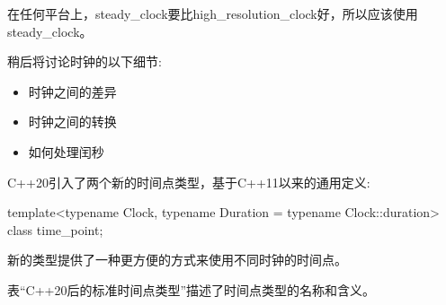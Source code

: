 在任何平台上，steady\_clock要比high\_resolution\_clock好，所以应该使用steady\_clock。

稍后将讨论时钟的以下细节:

\begin{itemize}
\item
时钟之间的差异

\item
时钟之间的转换

\item
如何处理闰秒
\end{itemize}


C++20引入了两个新的时间点类型，基于C++11以来的通用定义:

\begin{cpp}
template<typename Clock, typename Duration = typename Clock::duration>
class time_point;
\end{cpp}

新的类型提供了一种更方便的方式来使用不同时钟的时间点。

表“C++20后的标准时间点类型”描述了时间点类型的名称和含义。

